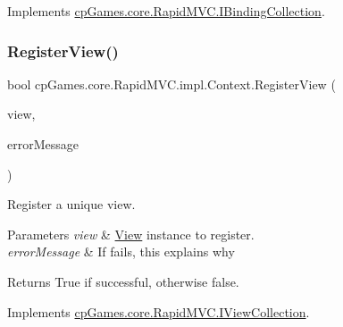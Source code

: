 Implements \mbox{\hyperlink{interfacecp_games_1_1core_1_1_rapid_m_v_c_1_1_i_binding_collection_a38fe8a92150b2901ed27abeacef14b2e}{cp\+Games.\+core.\+Rapid\+M\+V\+C.\+I\+Binding\+Collection}}.

\mbox{\label{classcp_games_1_1core_1_1_rapid_m_v_c_1_1impl_1_1_context_aaca630e99979716757f6b028b8b4aa0c}} 
\subsubsection{\texorpdfstring{RegisterView()}{RegisterView()}}
{\footnotesize\ttfamily bool cp\+Games.\+core.\+Rapid\+M\+V\+C.\+impl.\+Context.\+Register\+View (\begin{DoxyParamCaption}\item[{\mbox{\hyperlink{interfacecp_games_1_1core_1_1_rapid_m_v_c_1_1_i_view}{I\+View}}}]{view,  }\item[{out string}]{error\+Message }\end{DoxyParamCaption})}



Register a unique view. 


\begin{DoxyParams}{Parameters}
{\em view} & \mbox{\hyperlink{classcp_games_1_1core_1_1_rapid_m_v_c_1_1_view}{View}} instance to register.\\
\hline
{\em error\+Message} & If fails, this explains why\\
\hline
\end{DoxyParams}
\begin{DoxyReturn}{Returns}
True if successful, otherwise false.
\end{DoxyReturn}


Implements \mbox{\hyperlink{interfacecp_games_1_1core_1_1_rapid_m_v_c_1_1_i_view_collection_aba8465ad92ed63a4ad210c60d50cfc56}{cp\+Games.\+core.\+Rapid\+M\+V\+C.\+I\+View\+Collection}}.

\mbox{\label{classcp_games_1_1core_1_1_rapid_m_v_c_1_1impl_1_1_context_a665aa684d703ef7a67897c84274a494c}} 
